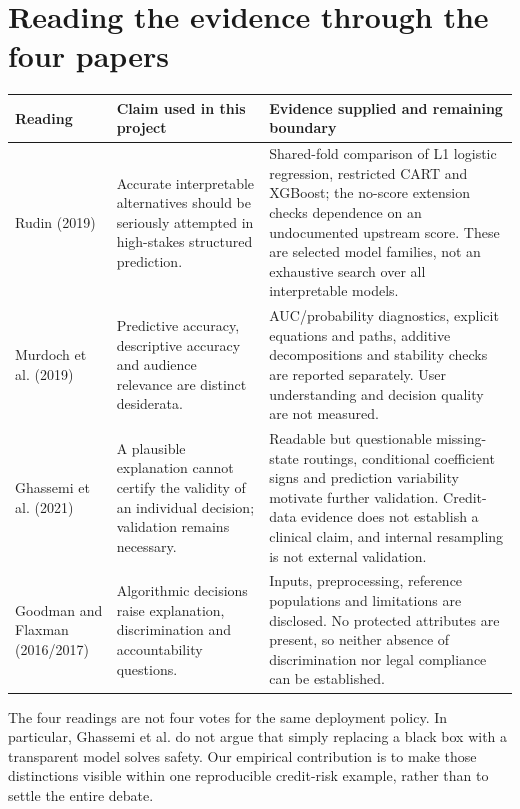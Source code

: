 \section{Reading the evidence through the four papers}\label{app:literature}

\begin{longtable}{@{}>{\raggedright\arraybackslash}p{2.4cm}>{\raggedright\arraybackslash}p{4.35cm}>{\raggedright\arraybackslash}p{8.65cm}@{}}
\toprule
Reading & Claim used in this project & Evidence supplied and remaining boundary \\
\midrule
\endhead
Rudin (2019) & Accurate interpretable alternatives should be seriously attempted in high-stakes structured prediction. & Shared-fold comparison of L1 logistic regression, restricted CART and XGBoost; the no-score extension checks dependence on an undocumented upstream score. These are selected model families, not an exhaustive search over all interpretable models. \\
Murdoch et al. (2019) & Predictive accuracy, descriptive accuracy and audience relevance are distinct desiderata. & AUC/probability diagnostics, explicit equations and paths, additive decompositions and stability checks are reported separately. User understanding and decision quality are not measured. \\
Ghassemi et al. (2021) & A plausible explanation cannot certify the validity of an individual decision; validation remains necessary. & Readable but questionable missing-state routings, conditional coefficient signs and prediction variability motivate further validation. Credit-data evidence does not establish a clinical claim, and internal resampling is not external validation. \\
Goodman and Flaxman (2016/2017) & Algorithmic decisions raise explanation, discrimination and accountability questions. & Inputs, preprocessing, reference populations and limitations are disclosed. No protected attributes are present, so neither absence of discrimination nor legal compliance can be established. \\
\bottomrule
\end{longtable}

The four readings are not four votes for the same deployment policy. In particular, Ghassemi et al. do not argue that simply replacing a black box with a transparent model solves safety. Our empirical contribution is to make those distinctions visible within one reproducible credit-risk example, rather than to settle the entire debate.

